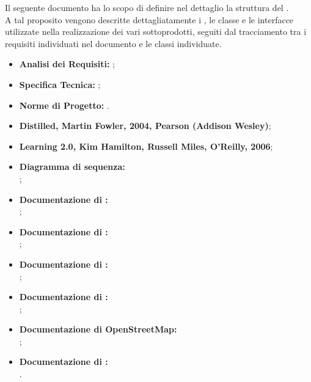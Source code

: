 
		Il seguente documento ha lo scopo di definire nel dettaglio la struttura del  \groupname{}. \\ A tal proposito vengono descritte dettagliatamente i , le classe e le interfacce utilizzate nella realizzazione dei vari sottoprodotti, seguiti dal tracciamento tra i requisiti individuati nel documento  e le classi individuate.

	


			\begin{itemize}
				\item \textbf{Analisi dei Requisiti:} ;
				\item \textbf{Specifica Tecnica:} ;
				\item \textbf{Norme di Progetto:} .
			\end{itemize}
			\begin{itemize}
				\item \textbf{ Distilled, Martin Fowler, 2004, Pearson (Addison Wesley)};
				\item \textbf{Learning  2.0, Kim Hamilton, Russell Miles, O'Reilly, 2006};
				\item \textbf{Diagramma di sequenza:} \\ 
				;
				\item \textbf{Documentazione di :} \\
				;
				\item \textbf{Documentazione di :} \\
				;
				\item \textbf{Documentazione di :} \\
				;
				\item \textbf{Documentazione di :} \\
				;
				\item \textbf{Documentazione di OpenStreetMap:} \\
				;
				\item \textbf{Documentazione di :} \\
				.
			\end{itemize}